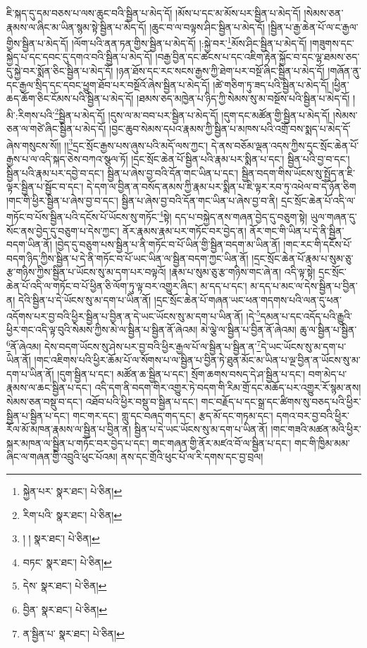 ཇི་སྐད་དུ་དམ་བཅས་པ་ལས་ཆུང་བའི་སྦྱིན་པ་མེད་དོ། །མོས་པ་དང་མ་མོས་པར་སྦྱིན་པ་མེད་དོ། །སེམས་ཅན་རྣམས་ལ་ཞིང་མ་ཡིན་སྙམ་སྟེ་སྦྱིན་པ་མེད་དོ། །ཆུང་བ་ལ་བལྟས་ཤིང་སྦྱིན་པ་མེད་དོ། །སྦྱིན་པ་རྒྱ་ཆེན་པོ་ལ་ང་རྒྱལ་གྱིས་སྦྱིན་པ་མེད་དོ། །ལོག་པའི་ནན་ཏན་གྱིས་སྦྱིན་པ་མེད་དོ། །:སྐྱེ་བར་\footnote{སྐྱེན་པར་  སྣར་ཐང་།  པེ་ཅིན། }མོས་ཤིང་སྦྱིན་པ་མེད་དོ། །གཟུགས་དང་སྐྱེད་པ་དང་དབང་དུ་དགའ་བའི་སྦྱིན་པ་མེད་དོ། །བརྒྱ་བྱིན་དང་ཚངས་པ་དང་འཇིག་རྟེན་སྐྱོང་བ་དང་ལྷ་ཐམས་ཅད་དུ་སྐྱེ་བར་སྨོན་ཅིང་སྦྱིན་པ་མེད་དོ། །ཉན་ཐོས་དང་རང་སངས་རྒྱས་ཀྱི་ཐེག་པར་བསྔོ་ཞིང་སྦྱིན་པ་མེད་དོ། །གཞོན་ནུ་དང་རྒྱལ་སྲིད་དང་དབང་ཕྱུག་ཐོབ་པར་བསྔོའོ་ཞེས་སྦྱིན་པ་མེད་དོ། །ཚེ་གཅིག་ཏུ་ཟད་པའི་སྦྱིན་པ་མེད་དོ། །ཕྱིན་ཆད་ཆོག་ཅིང་ངོམས་པའི་སྦྱིན་པ་མེད་དོ། །ཐམས་ཅད་མཁྱེན་པ་ཉིད་ཀྱི་སེམས་སུ་མ་བསྔོས་པའི་སྦྱིན་པ་མེད་དོ། །མི་:རིགས་པའི་\footnote{རིག་པའི་  སྣར་ཐང་།  པེ་ཅིན། }སྦྱིན་པ་མེད་དོ། །དུས་ལ་མ་བབ་པར་སྦྱིན་པ་མེད་དོ། །དུག་དང་མཚོན་གྱི་སྦྱིན་པ་མེད་དོ། །སེམས་ཅན་ལ་གཙེ་ཞིང་སྦྱིན་པ་མེད་དོ། །བྱང་ཆུབ་སེམས་དཔའ་རྣམས་ཀྱི་སྦྱིན་པ་མཁས་པའི་འགྲོ་བས་སྨད་པ་མེད་དོ་ཞེས་གསུངས་སོ།། །།\footnote{། །  སྣར་ཐང་།  པེ་ཅིན། }དྲང་སྲོང་རྒྱས་པས་ཞུས་པའི་མདོ་ལས་ཀྱང་། དེ་ནས་བཅོམ་ལྡན་འདས་ཀྱིས་དྲང་སྲོང་ཆེན་པོ་རྒྱས་པ་ལ་འདི་སྐད་ཅེས་བཀའ་སྩལ་ཏོ། །དྲང་སྲོང་ཆེན་པོ་སྦྱིན་པའི་རྣམ་པར་སྨིན་པ་དང་། སྦྱིན་པའི་བྱ་བ་དང་། སྦྱིན་པའི་རྣམ་པར་དབྱེ་བ་དང་། སྦྱིན་པ་ཞེས་བྱ་བའི་དོན་གང་ཡིན་པ་དང་། སྦྱིན་བདག་གིས་ཡོངས་སུ་སྤྱོད་ན་ཇི་ལྟར་སྦྱིན་པ་སྦྱོང་བ་དང་། དེ་དག་ལ་བྱིན་ན་བསོད་ནམས་ཀྱི་རྣམ་པར་སྨིན་པ་ཇི་ལྟར་རབ་ཏུ་འཕེལ་བ་དེ་ཉོན་ཅིག །གང་གི་ཕྱིར་སྦྱིན་པ་ཞེས་བྱ་བ་དང་། སྦྱིན་པ་ཞེས་བྱ་བའི་དོན་གང་ཡིན་པ་ཞེས་བྱ་བ་ནི། དྲང་སྲོང་ཆེན་པོ་འདི་ལ་གཏོང་བ་པོས་སྦྱིན་པའི་དངོས་པོ་ཡོངས་སུ་གཏོང་\footnote{བཏང་  སྣར་ཐང་།  པེ་ཅིན། }སྟེ། དད་པ་བསྐྱེད་ནས་གཞན་བྱེད་དུ་བཅུག་སྟེ། ཡུལ་གཞན་དུ་སོང་ནས་བྱེད་དུ་བཅུག་པ་དེས་ཀྱང་། ནོར་རྣམས་རྣམ་པར་གཏོང་བར་བྱེད་ན། ནོར་གང་གི་ཡིན་པ་དེ་ནི་སྦྱིན་བདག་ཡིན་ནོ། །བྱེད་དུ་བཅུག་པས་སྦྱིན་པ་ནི་གཏོང་བ་པོ་ཡིན་གྱི་སྦྱིན་བདག་མ་ཡིན་ནོ། །གང་རང་གི་དངོས་པོ་བདག་ཉིད་ཀྱིས་སྦྱིན་པ་དེ་ནི་གཏོང་བ་པོ་ཡང་ཡིན་ལ་སྦྱིན་བདག་ཀྱང་ཡིན་ནོ། །དྲང་སྲོང་ཆེན་པོ་རྣམ་པ་སུམ་ཅུ་རྩ་གཉིས་ཀྱིས་སྦྱིན་པ་ཡོངས་སུ་མ་དག་པར་བལྟའོ། །རྣམ་པ་སུམ་ཅུ་རྩ་གཉིས་གང་ཞེ་ན། འདི་ལྟ་སྟེ། དྲང་སྲོང་ཆེན་པོ་འདི་ལ་གཏོང་བ་པོ་ཕྱིན་ཅི་ལོག་ཏུ་ལྟ་བར་འགྱུར་ཞིང་། མ་དད་པ་དང་། མ་དད་པ་མང་ལ་དེས་སྦྱིན་པ་བྱིན་ན། དེའི་སྦྱིན་པ་དེ་ཡོངས་སུ་མ་དག་པ་ཡིན་ནོ། །དྲང་སྲོང་ཆེན་པོ་གཞན་ཡང་ཕན་གདགས་པའི་ལན་དུ་ཕན་འདོགས་པར་བྱ་བའི་ཕྱིར་སྦྱིན་པ་བྱིན་ན་དེ་ཡང་ཡོངས་སུ་མ་དག་པ་ཡིན་ནོ། །དེ་\footnote{དེས་  སྣར་ཐང་།  པེ་ཅིན། }དམན་པ་དང་འདོད་པའི་རྒྱུའི་ཕྱིར་གང་འདི་ལྟ་བུའི་སེམས་ཀྱིས་མེ་ལ་སྦྱིན་པ་སྦྱིན་ནོ་ཞེའམ། མེ་ལྕེ་ལ་སྦྱིན་པ་བྱིན་ནོ་ཞེའམ། ཆུ་ལ་སྦྱིན་པ་སྦྱིན་\footnote{བྱིན་  སྣར་ཐང་།  པེ་ཅིན། }ནོ་ཞེའམ། དེས་བདག་ཡོངས་སུ་ཤེས་པར་བྱ་བའི་ཕྱིར་རྒྱལ་པོ་ལ་སྦྱིན་པ་སྦྱིན་ན་\footnote{ན་སྦྱིན་པ་  སྣར་ཐང་།  པེ་ཅིན། }དེ་ཡང་ཡོངས་སུ་མ་དག་པ་ཡིན་ནོ། །གང་འཇིགས་པའི་ཕྱིར་ཆོམ་པོ་ལ་སོགས་པ་ལ་སྦྱིན་པ་བྱིན་ཏེ་ཐུན་མོང་མ་ཡིན་པ་ལྔ་བྱིན་ན་ཡོངས་སུ་མ་དག་པ་ཡིན་ནོ། །དུག་སྦྱིན་པ་དང་། མཚོན་ཆ་སྦྱིན་པ་དང་། སྲོག་ཆགས་བསད་དེ་ཤ་སྦྱིན་པ་དང་། བག་མེད་པ་རྣམས་ལ་ཆང་སྦྱིན་པ་དང་། འདི་དག་ནི་བདག་གིར་འགྱུར་ཏེ་བདག་གི་རིམ་གྲོ་དང་མཆོད་པར་འགྱུར་རོ་སྙམ་ནས། སེམས་ཅན་བསྡུ་བ་དང་། འཐོབ་པའི་ཕྱིར་བསྡུ་བ་སྦྱིན་པ་དང་། གང་བརྗོད་པ་དང་སྒྲ་དང་ཚིགས་སུ་བཅད་པའི་ཕྱིར་སྦྱིན་པ་སྦྱིན་པ་དང་། གང་གར་དང་། གླུ་དང་བཞད་གད་དང་། རྩད་མོ་དང་གཏམ་དང་། དགའ་བར་བྱ་བའི་ཕྱིར་རོལ་མོ་མཁན་རྣམས་ལ་སྦྱིན་པ་བྱིན་ན། སྦྱིན་པ་དེ་ཡང་ཡོངས་སུ་མ་དག་པ་ཡིན་ནོ། །གང་གཟའི་མཚན་མའི་ཕྱིར་སྐར་མཁན་ལ་སྦྱིན་པ་གཏོང་བར་བྱེད་པ་དང་། གང་གཞན་གྱི་ནོར་མཛའ་བོ་ལ་སྦྱིན་པ་དང་། གང་གི་ཁྱིམ་མམ་ཞིང་ལ་གཞན་གྱི་འབྲུའི་ཕུང་པོའམ། ནས་དང་གྲོའི་ཕུང་པོ་ལ་རི་དགས་དང་བྱ་བྲལ། 